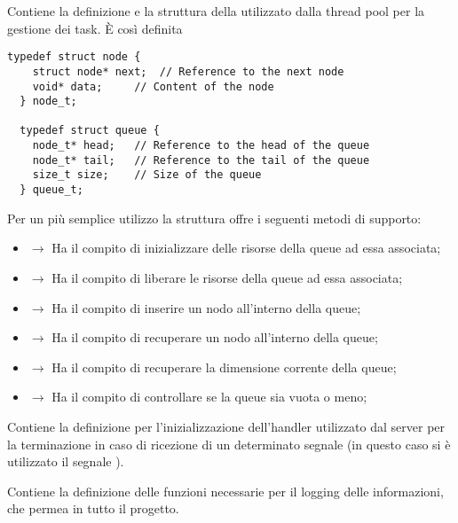   \begin{center}  \end{center}

  Contiene la definizione e la struttura della  \footnotemark {} utilizzato dalla thread pool per la gestione dei task. È così definita

  \begin{lstlisting}[language={[POSIX]C}, style=wnumbers]
  typedef struct node {
    struct node* next;	// Reference to the next node
    void* data;		// Content of the node
  } node_t;

  typedef struct queue {
    node_t* head;	// Reference to the head of the queue
    node_t* tail;	// Reference to the tail of the queue
    size_t size;	// Size of the queue
  } queue_t;
  \end{lstlisting}

  Per un più semplice utilizzo la struttura offre i seguenti metodi di supporto:

  \begin{itemize}
    \item {} $\rightarrow$ Ha il compito di inizializzare delle risorse della queue ad essa associata;
    \item {} $\rightarrow$ Ha il compito di liberare le risorse della queue ad essa associata;
    \item {} $\rightarrow$ Ha il compito di inserire un nodo all'interno della queue;
    \item {} $\rightarrow$ Ha il compito di recuperare un nodo all'interno della queue;
    \item {} $\rightarrow$ Ha il compito di recuperare la dimensione corrente della queue;
    \item {} $\rightarrow$ Ha il compito di controllare se la queue sia vuota o meno;
  \end{itemize}


  \begin{center}  \end{center}
  Contiene la definizione per l'inizializzazione dell'handler utilizzato dal server per la terminazione in caso di ricezione di un determinato segnale (in questo caso si è utilizzato il segnale ).

  \begin{center}  \end{center}
  Contiene la definizione delle funzioni necessarie per il logging delle informazioni, che permea in tutto il progetto.

